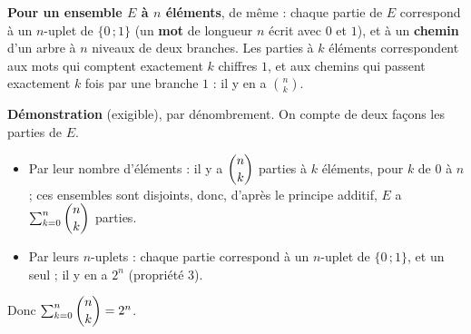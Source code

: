 \documentclass[11pt,a4paper]{article}
\begin{document}
\smallskip
\textbf{Pour un ensemble $E$ à $n$ éléments}, de même : chaque partie de $E$ correspond
à un $n$-uplet de $\{0\,;1\}$ (un \textbf{mot} de longueur $n$ écrit avec $0$ et $1$),
et à un \textbf{chemin} d'un arbre à $n$ niveaux de deux branches. Les parties à $k$
éléments correspondent aux mots qui comptent exactement $k$ chiffres $1$, et aux chemins
qui passent exactement $k$ fois par une branche $1$ : il y en a $\binom{n}{k}$.

\smallskip
\textbf{\color{coulMeth}Démonstration} (exigible), par dénombrement.
On compte de deux façons les parties de $E$.
\begin{itemize}
  \item Par leur nombre d'éléments : il y a $\dbinom{n}{k}$ parties à $k$ éléments, pour
        $k$ de $0$ à $n$ ; ces ensembles sont disjoints, donc, d'après le principe
        additif, $E$ a $\sum_{k=0}^{n}\dbinom{n}{k}$ parties.
  \item Par leurs $n$-uplets : chaque partie correspond à un $n$-uplet de $\{0\,;1\}$, et
        un seul ; il y en a $2^{n}$ (propriété 3).
\end{itemize}
Donc $\sum_{k=0}^{n}\dbinom{n}{k}=2^{n}$.
\end{document}
